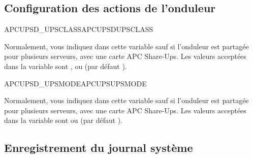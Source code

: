 \subsection{Configuration des actions de l'onduleur}

\begin {description}

 {APCUPSD\_UPSCLASS}{APCUPSDUPSCLASS}


   Normalement, vous indiquez dans cette variable 
   sauf si l'onduleur est partagée pour plusieurs serveurs, avec une
   carte APC Share-Ups. Les valeurs acceptées dans la variable
    sont , 
   ou  (par défaut ).


 {APCUPSD\_UPSMODE}{APCUPSUPSMODE}

   Normalement, vous indiquez dans cette variable 
   sauf si l'onduleur est partagée pour plusieurs serveurs, avec une
   carte APC Share-Ups. Les valeurs acceptées dans la variable
    sont  ou 
   (par défaut ).

\end {description}

\subsection{Enregistrement du journal système}

